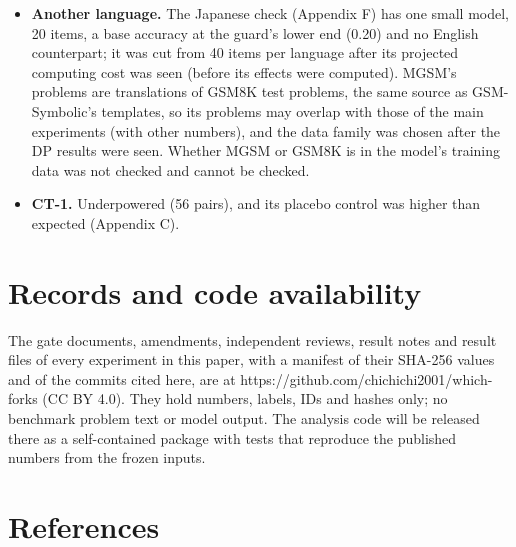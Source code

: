 \documentclass[
  10pt,
  a4paper,
]{article}
\begin{document}
\begin{itemize}
  earlier tests with their rules and added one test. Confirmatory claims rest only on the outcomes obtained under pre-registration; the R1 results, including the weight-only baseline, are reported as
  post hoc support. The within-item reading of DP1, the pooled-AUROC diagnosis and the feature sweep EX-1 (Appendix H; no correction for multiple comparisons) are reported as exploratory.
\item
  \textbf{Another language.} The Japanese check (Appendix F) has one small model, 20 items, a base accuracy at the guard's lower end (0.20) and no English counterpart; it was cut from 40 items per
  language after its projected computing cost was seen (before its effects were computed). MGSM's problems are translations of GSM8K test problems, the same source as GSM-Symbolic's templates, so its
  problems may overlap with those of the main experiments (with other numbers), and the data family was chosen after the DP results were seen. Whether MGSM or GSM8K is in the model's training data was
  not checked and cannot be checked.
\item
  \textbf{CT-1.} Underpowered (56 pairs), and its placebo control was higher than expected (Appendix C).
\end{itemize}

\hypertarget{records-and-code-availability}{%
\section{Records and code availability}\label{records-and-code-availability}}

The gate documents, amendments, independent reviews, result notes and result files of every experiment in this paper, with a manifest of their SHA-256 values and of the commits cited here, are at
https://github.com/chichichi2001/which-forks (CC BY 4.0). They hold numbers, labels, IDs and hashes only; no benchmark problem text or model output. The analysis code will be released there as a
self-contained package with tests that reproduce the published numbers from the frozen inputs.

\hypertarget{references}{%
\section*{References}\label{references}}

\begingroup\small
\end{document}
